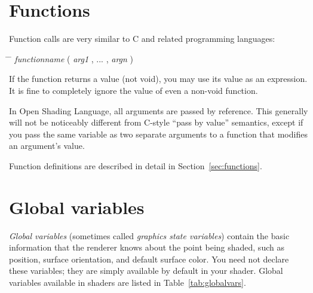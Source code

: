 \documentclass[11pt,letterpaper]{book}
\def\langname{Open Shading Language\xspace}
\def\void{{\cf void}\xspace}
\begin{document}
\section{Functions}
\label{sec:syntax:functions}

Function calls are very similar to C and related programming languages:

\begin{tabbing}
\hspace{0.5in} \= \hspace{0.3in} \= \kill
\> \emph{functionname} {\cf (} \emph{arg1} {\cf ,} ... {\cf ,} \emph{argn} {\cf )} \\
\end{tabbing}

If the function returns a value (not \void), you may use its value as
an expression.  It is fine to completely ignore the value of even
a non-\void function.

In \langname, all arguments are passed by reference.  This generally
will not be noticeably different from C-style ``pass by value''
semantics, except if you pass the same variable as two separate
arguments to a function that modifies an argument's value.

Function definitions are described in detail in Section~\ref{sec:functions}.



\section{Global variables}
\label{sec:globalvars}

\emph{Global variables} (sometimes called \emph{graphics state
variables}) contain the basic information that the renderer knows
about the point being shaded, such as position, surface orientation, and
default surface color.  You need not declare these variables; they are
simply available by default in your shader.  Global variables available
in shaders are listed in Table~\ref{tab:globalvars}.
\end{document}
